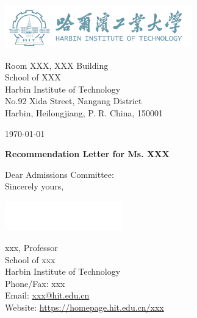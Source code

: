 \documentclass[12pt, a4paper]{letter} %
\begin{document}
    \begin{minipage}{0.5\textwidth}
        \includegraphics[width=3.2in]{pic/1.png}\\ %
    \end{minipage}
    \hfill
    \begin{minipage}{0.6\textwidth}\raggedright
        \small{ 
            \hphantom{AA}Room XXX, XXX Building \\ %
            \hphantom{AA}School of XXX \\
            \hphantom{AA}Harbin Institute of Technology \\
            \hphantom{AA}No.92 Xida Street, Nangang District \\
            \hphantom{AA}Harbin, Heilongjiang, P. R. China, 150001\\
        }
    \end{minipage}

    \vspace{0.4in} %

    \today

    \textbf{Recommendation Letter for Ms. XXX}

    Dear Admissions Committee:\\


    Sincerely yours,

    \includegraphics[width=2in]{pic/emp.png} %

    xxx, Professor \\ %
    School of xxx \\
    Harbin Institute of Technology \\
    Phone/Fax: xxx \\ 
    Email: \href{mailto:xxx@nenu.edu.cn}{xxx@hit.edu.cn} \\
    Website: \url{https://homepage.hit.edu.cn/xxx} \\%
\end{document}
